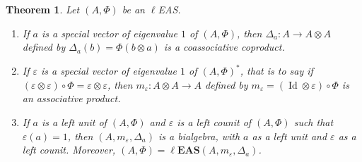 \documentclass[10pt,a4paper]{amsart}
\numberwithin{equation}{section}
\newtheorem{Theorem}{Theorem}[section]
\newcommand{\leas}{\ell\mathbf{EAS}}
\begin{document}
\begin{Theorem}\label{theo5.12}
Let $(A,\Phi)$ be an $\ell$EAS.
\begin{enumerate}\itemsep=0pt
\item[$(1)$] If $a$ is a special vector of eigenvalue $1$ of $(A,\Phi)$, then $\Delta_a\colon A\longrightarrow A\otimes A$ defined by $\Delta_a(b)=\Phi(b\otimes a)$ is a coassociative coproduct.
\item[$(2)$] If $\varepsilon$ is a special vector of eigenvalue $1$ of $(A,\Phi)^*$, that is to say if $(\varepsilon\otimes \varepsilon)\circ \Phi=\varepsilon\otimes \varepsilon$,
 then $m_\varepsilon\colon A\otimes A\longrightarrow A$ defined by $m_\varepsilon=(\operatorname{Id} \otimes \varepsilon)\circ \Phi$ is an associative product.
\item[$(3)$] If $a$ is a left unit of $(A,\Phi)$ and $\varepsilon$ is a left counit of $(A,\Phi)$ such that $\varepsilon(a)=1$, then $(A,m_\varepsilon,\Delta_a)$ is a bialgebra, with $a$ as a left unit and $\varepsilon$ as a left counit.
Moreover, $(A,\Phi)=\leas(A,m_\varepsilon,\Delta_a)$.
\end{enumerate}\end{Theorem}
\end{document}
